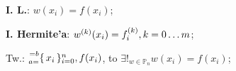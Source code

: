 
\entry
\textbf{I. L.}:
$w(x_i) = f(x_i)$;

\entry
\textbf{I. Hermite'a}:
$w^{(k)}(x_i) = f^{(k)}_i, k = 0 \ldots m$;

\entry
Tw.:
$\ipoints[i=0][n][a=][=b]{x_i}, f(x_i)$,
to
$\exists!_{w \in \mathbb{P}_n} w(x_i)=f(x_i)$;
